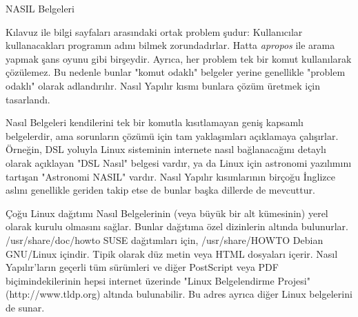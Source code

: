 \begin{section}{NASIL Belgeleri}

Kılavuz ile bilgi sayfaları arasındaki ortak problem şudur: Kullanıcılar kullanacakları programın adını bilmek zorundadırlar. Hatta \emph{apropos} ile arama yapmak şans oyunu gibi birşeydir. Ayrıca, her problem tek bir komut kullanılarak çözülemez. Bu nedenle bunlar "komut odaklı" belgeler yerine genellikle "problem odaklı" olarak adlandırılır. Nasıl Yapılır kısmı bunlara çözüm üretmek için tasarlandı.

Nasıl Belgeleri kendilerini tek bir komutla  kısıtlamayan geniş kapsamlı belgelerdir, ama sorunların çözümü için tam yaklaşımları açıklamaya çalışırlar. Örneğin, DSL yoluyla Linux sisteminin internete nasıl bağlanacağını detaylı olarak açıklayan "DSL Nasıl" belgesi vardır, ya da Linux için astronomi yazılımını tartışan "Astronomi NASIL" vardır. Nasıl Yapılır kısımlarının birçoğu İnglizce aslını genellikle geriden takip etse de bunlar başka dillerde de mevcuttur.

Çoğu Linux dağıtımı Nasıl Belgelerinin (veya büyük bir alt kümesinin) yerel olarak kurulu olmasını sağlar. Bunlar dağıtıma özel dizinlerin altında bulunurlar. /usr/share/doc/howto SUSE dağıtımları için, /usr/share/HOWTO Debian GNU/Linux içindir. Tipik olarak düz metin veya HTML dosyaları içerir. Nasıl Yapılır'ların geçerli tüm sürümleri ve diğer PostScript veya PDF biçimindekilerinin hepsi internet üzerinde "Linux Belgelendirme Projesi" (http://www.tldp.org) altında bulunabilir. Bu adres ayrıca diğer Linux belgelerini de sunar.
\end{section}
